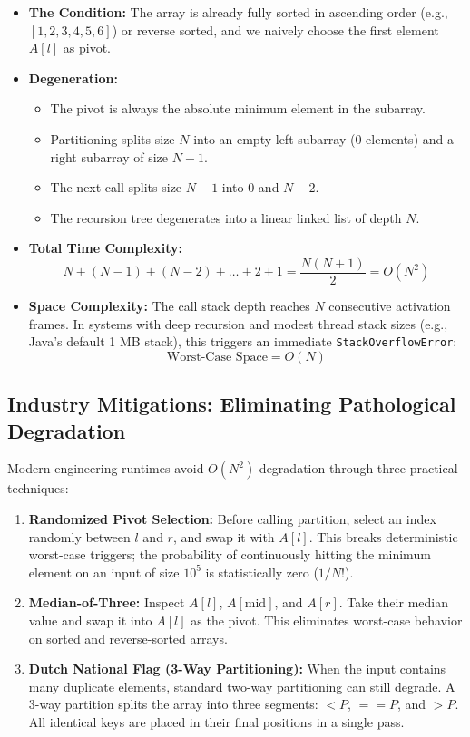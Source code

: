 \documentclass[10pt,journal,compsoc,onecolumn]{IEEEtran}
\begin{document}
\begin{itemize}
    \item \textbf{The Condition:} The array is already fully sorted in ascending order (e.g., $[1, 2, 3, 4, 5, 6]$) or reverse sorted, and we naively choose the first element $A[l]$ as pivot.
    \item \textbf{Degeneration:}
    \begin{itemize}
        \item The pivot is always the absolute minimum element in the subarray.
        \item Partitioning splits size $N$ into an empty left subarray ($0$ elements) and a right subarray of size $N - 1$.
        \item The next call splits size $N - 1$ into $0$ and $N - 2$.
        \item The recursion tree degenerates into a linear linked list of depth $N$.
    \end{itemize}
    \item \textbf{Total Time Complexity:}
    \[
    N + (N - 1) + (N - 2) + \dots + 2 + 1 = \frac{N(N + 1)}{2} = O(N^2)
    \]
    \item \textbf{Space Complexity:} The call stack depth reaches $N$ consecutive activation frames. In systems with deep recursion and modest thread stack sizes (e.g., Java's default 1 MB stack), this triggers an immediate \texttt{StackOverflowError}:
    \[
    \text{Worst-Case Space} = O(N)
    \]
\end{itemize}

\subsection{Industry Mitigations: Eliminating Pathological Degradation}

Modern engineering runtimes avoid $O(N^2)$ degradation through three practical techniques:
\begin{enumerate}
    \item \textbf{Randomized Pivot Selection:} Before calling partition, select an index randomly between $l$ and $r$, and swap it with $A[l]$. This breaks deterministic worst-case triggers; the probability of continuously hitting the minimum element on an input of size $10^5$ is statistically zero ($1 / N!$).
    \item \textbf{Median-of-Three:} Inspect $A[l]$, $A[\text{mid}]$, and $A[r]$. Take their median value and swap it into $A[l]$ as the pivot. This eliminates worst-case behavior on sorted and reverse-sorted arrays.
    \item \textbf{Dutch National Flag (3-Way Partitioning):} When the input contains many duplicate elements, standard two-way partitioning can still degrade. A 3-way partition splits the array into three segments: $< P$, $== P$, and $> P$. All identical keys are placed in their final positions in a single pass.
\end{enumerate}
\end{document}
